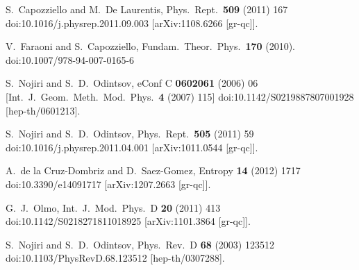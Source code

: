 \documentclass[aps,prd,twocolumn,groupedaddress,showpacs,nofootinbib,amssymb]{revtex4-2}
\begin{document}
\begin{thebibliography}{99}
S.~Capozziello and M.~De Laurentis,
Phys.\ Rept.\  {\bf 509} (2011) 167
doi:10.1016/j.physrep.2011.09.003 [arXiv:1108.6266 [gr-qc]].

V.~Faraoni and S.~Capozziello,
Fundam.\ Theor.\ Phys.\  {\bf 170} (2010).
doi:10.1007/978-94-007-0165-6



S.~Nojiri and S.~D.~Odintsov,
eConf C {\bf 0602061} (2006) 06
 [Int.\ J.\ Geom.\ Meth.\ Mod.\ Phys.\  {\bf 4} (2007) 115]
doi:10.1142/S0219887807001928 [hep-th/0601213].

S.~Nojiri and S.~D.~Odintsov,
Phys.\ Rept.\  {\bf 505} (2011) 59
doi:10.1016/j.physrep.2011.04.001 [arXiv:1011.0544 [gr-qc]].

A.~de la Cruz-Dombriz and D.~Saez-Gomez,
Entropy {\bf 14} (2012) 1717 doi:10.3390/e14091717
[arXiv:1207.2663 [gr-qc]].

G.~J.~Olmo,
Int.\ J.\ Mod.\ Phys.\ D {\bf 20} (2011) 413
doi:10.1142/S0218271811018925 [arXiv:1101.3864 [gr-qc]].


S.~Nojiri and S.~D.~Odintsov,
Phys.\ Rev.\ D {\bf 68} (2003) 123512
doi:10.1103/PhysRevD.68.123512 [hep-th/0307288].



\end{thebibliography}
\end{document}
